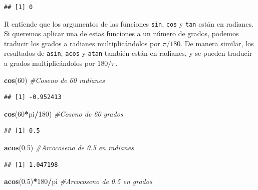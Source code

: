 \documentclass[]{book}
\newenvironment{Shaded}{\begin{snugshade}}{\end{snugshade}}
\newcommand{\CommentTok}[1]{\textcolor[rgb]{0.56,0.35,0.01}{\textit{#1}}}
\newcommand{\DecValTok}[1]{\textcolor[rgb]{0.00,0.00,0.81}{#1}}
\newcommand{\FloatTok}[1]{\textcolor[rgb]{0.00,0.00,0.81}{#1}}
\newcommand{\KeywordTok}[1]{\textcolor[rgb]{0.13,0.29,0.53}{\textbf{#1}}}
\newcommand{\NormalTok}[1]{#1}
\newcommand{\OperatorTok}[1]{\textcolor[rgb]{0.81,0.36,0.00}{\textbf{#1}}}
\theoremstyle{definition}
\theoremstyle{definition}
\theoremstyle{definition}
\theoremstyle{remark}
\begin{document}
\begin{verbatim}
## [1] 0
\end{verbatim}

R entiende que los argumentos de las funciones \texttt{sin}, \texttt{cos} y \texttt{tan} están en radianes. Si queremos aplicar una de estas funciones a un número de grados, podemos traducir los grados a radianes multiplicándolos por \(\pi/180\).
De manera similar, los resultados de \texttt{asin}, \texttt{acos} y \texttt{atan} también están en radianes, y se pueden traducir a grados
multiplicándolos por \(180/\pi\).

\begin{Shaded}
\begin{Highlighting}[]
\KeywordTok{cos}\NormalTok{(}\DecValTok{60}\NormalTok{) }\CommentTok{#Coseno de 60 radianes}
\end{Highlighting}
\end{Shaded}

\begin{verbatim}
## [1] -0.952413
\end{verbatim}

\begin{Shaded}
\begin{Highlighting}[]
\KeywordTok{cos}\NormalTok{(}\DecValTok{60}\OperatorTok{*}\NormalTok{pi}\OperatorTok{/}\DecValTok{180}\NormalTok{) }\CommentTok{#Coseno de 60 grados}
\end{Highlighting}
\end{Shaded}

\begin{verbatim}
## [1] 0.5
\end{verbatim}

\begin{Shaded}
\begin{Highlighting}[]
\KeywordTok{acos}\NormalTok{(}\FloatTok{0.5}\NormalTok{)  }\CommentTok{#Arcocoseno de 0.5 en radianes}
\end{Highlighting}
\end{Shaded}

\begin{verbatim}
## [1] 1.047198
\end{verbatim}

\begin{Shaded}
\begin{Highlighting}[]
\KeywordTok{acos}\NormalTok{(}\FloatTok{0.5}\NormalTok{)}\OperatorTok{*}\DecValTok{180}\OperatorTok{/}\NormalTok{pi }\CommentTok{#Arcocoseno de 0.5 en grados}
\end{Highlighting}
\end{Shaded}
\end{document}
